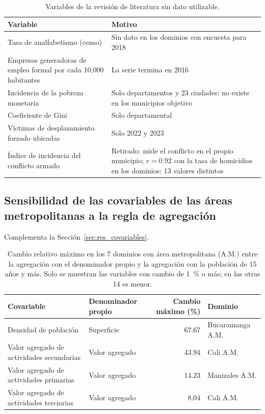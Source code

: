 \begin{table}[!htbp]
\centering
\small
\caption{Variables de la revisión de literatura sin dato utilizable.}
\label{tab:res_excluidas}
\begin{tabularx}{\linewidth}{>{\raggedright\arraybackslash}p{5.2cm} >{\raggedright\arraybackslash}X}
\toprule
Variable & Motivo \\
\midrule
Tasa de analfabetismo (censo) & Sin dato en los dominios con encuesta para 2018 \\
Empresas generadoras de empleo formal por cada 10,000 habitantes & La serie termina en 2016 \\
Incidencia de la pobreza monetaria & Solo departamentos y 23 ciudades; no existe en los municipios objetivo \\
Coeficiente de Gini & Solo departamental \\
Víctimas de desplazamiento forzado ubicadas & Solo 2022 y 2023 \\
Índice de incidencia del conflicto armado & Retirado: mide el conflicto en el propio municipio; $r = 0.92$ con la tasa de homicidios en los dominios; 13 valores distintos \\
\bottomrule
\end{tabularx}
\end{table}

\subsection{Sensibilidad de las covariables de las áreas metropolitanas a la regla de agregación}

Complementa la Sección~\ref{sec:res_covariables}.

\begin{table}[!htbp]
\centering
\small
\caption[Sensibilidad de las covariables de las áreas metropolitanas a la regla de agregación]{Cambio relativo máximo en los 7 dominios con área metropolitana (A.M.) entre la agregación con el denominador propio y la agregación con la población de 15 años y más. Solo se muestran las variables con cambio de 1~\% o más; en las otras 14 es menor.}
\label{tab:res_agregacion_am}
\begin{adjustbox}{max width=\linewidth}
\begin{tabular}{l l r l}
\toprule
Covariable & Denominador propio & Cambio máximo (\%) & Dominio \\
\midrule
Densidad de población & Superficie & 67.67 & Bucaramanga A.M. \\
Valor agregado de actividades secundarias & Valor agregado & 43.94 & Cali A.M. \\
Valor agregado de actividades primarias & Valor agregado & 14.23 & Manizales A.M. \\
Valor agregado de actividades terciarias & Valor agregado & 8.04 & Cali A.M. \\
\bottomrule
\end{tabular}
\end{adjustbox}
\end{table}

